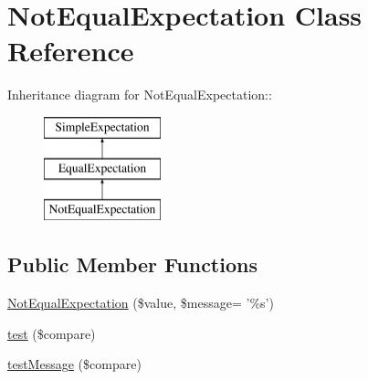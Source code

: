 \hypertarget{class_not_equal_expectation}{
\section{NotEqualExpectation Class Reference}
\label{class_not_equal_expectation}
}
Inheritance diagram for NotEqualExpectation::\begin{figure}[H]
\begin{center}
\leavevmode
\includegraphics[height=3cm]{class_not_equal_expectation}
\end{center}
\end{figure}
\subsection*{Public Member Functions}
\begin{DoxyCompactItemize}
\item 
\hyperlink{class_not_equal_expectation_ab341bfe20b6160cba5bc3222b64214c1}{NotEqualExpectation} (\$value, \$message= '\%s')
\item 
\hyperlink{class_not_equal_expectation_a4d224959c7900fa36eadb05907129d4c}{test} (\$compare)
\item 
\hyperlink{class_not_equal_expectation_acdebe1e65b7080f419bdaad3a15981a0}{testMessage} (\$compare)
\end{DoxyCompactItemize}


